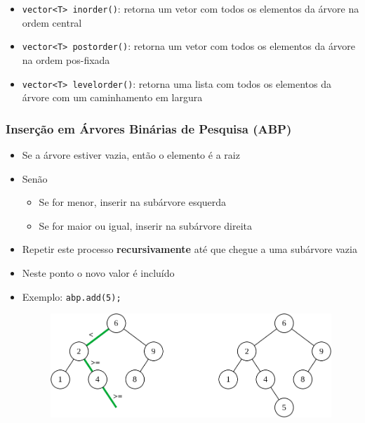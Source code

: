 \documentclass[aspectratio=169]{beamer}
\begin{document}
\begin{frame}
\begin{itemize}
	\item \texttt{vector<T> inorder()}: retorna um vetor com todos os elementos da árvore na ordem central\\
	\item \texttt{vector<T> postorder()}: retorna um vetor com todos os elementos da árvore na ordem pos-fixada\\
	\item \texttt{vector<T> levelorder()}: retorna uma lista com todos os elementos da árvore com um caminhamento em largura\\
\end{itemize}
\end{frame}

\begin{frame}\frametitle{Inserção em Árvores Binárias de Pesquisa (ABP)}
\begin{itemize}
	\item Se a árvore estiver vazia, então o elemento é a raiz
	\item Senão
	\begin{itemize}
		\item Se for menor, inserir na subárvore esquerda
		\item Se for maior ou igual, inserir na subárvore direita
	\end{itemize}
	\item Repetir este processo \textbf{recursivamente} até que chegue a uma subárvore vazia
	\item Neste ponto o novo valor é incluído
	\item Exemplo: \texttt{abp.add(5);}
\begin{figure}[h]
	\centering
	\includegraphics[height=0.3\paperheight]{imagens/abp-insercao.png}
\end{figure}
\end{itemize}
\end{frame}
\end{document}
